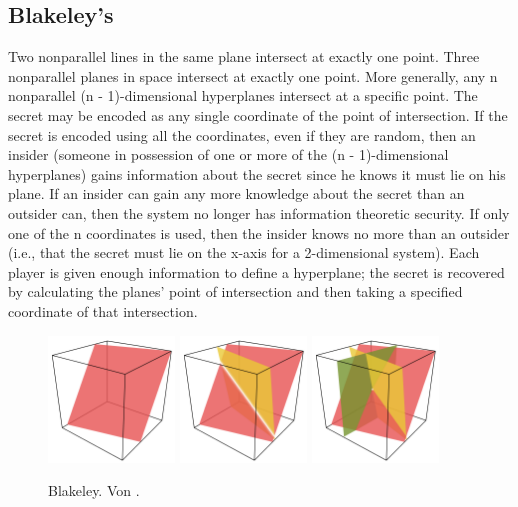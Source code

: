 \documentclass[12pt, a4paper, oneside, titlepage]{report}
\theoremstyle{definition}
\begin{document}
	\subsection{Blakeley's}
		Two nonparallel lines in the same plane intersect at exactly one point. Three nonparallel planes in space intersect at exactly one point. More generally, any n nonparallel (n - 1)-dimensional hyperplanes intersect at a specific point. The secret may be encoded as any single coordinate of the point of intersection. If the secret is encoded using all the coordinates, even if they are random, then an insider (someone in possession of one or more of the (n - 1)-dimensional hyperplanes) gains information about the secret since he knows it must lie on his plane. If an insider can gain any more knowledge about the secret than an outsider can, then the system no longer has information theoretic security. If only one of the n coordinates is used, then the insider knows no more than an outsider (i.e., that the secret must lie on the x-axis for a 2-dimensional system). Each player is given enough information to define a hyperplane; the secret is recovered by calculating the planes' point of intersection and then taking a specified coordinate of that intersection.
		
		\begin{figure}[H]
			\centering
			\includegraphics[width=0.3\textwidth]{images/blakeley1.png}
			\includegraphics[width=0.3\textwidth]{images/blakeley2.png}
			\includegraphics[width=0.3\textwidth]{images/blakeley3.png}
			\caption{Blakeley. Von \cite{wikipedia}.}
			\label{generation-of-2nd-sheet}
		\end{figure}
		
\end{document}
